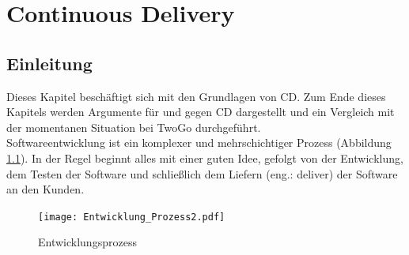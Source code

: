 
\chapter{Continuous Delivery}

\section{Einleitung}
Dieses Kapitel beschäftigt sich mit den Grundlagen von \acl{CD}. Zum Ende dieses Kapitels werden Argumente für und gegen \acs{CD} dargestellt und ein Vergleich mit der momentanen Situation bei TwoGo durchgeführt.\\
Softwareentwicklung ist ein komplexer und mehrschichtiger Prozess (Abbildung \ref{img:Entwicklungsprozess}). In der Regel beginnt alles mit einer guten Idee, gefolgt von der Entwicklung, dem Testen der Software und schließlich dem Liefern (eng.: deliver) der Software an den Kunden.
\begin{figure}[H]
    \centering
    \texttt{[image: Entwicklung\_Prozess2.pdf]}
    \caption{Entwicklungsprozess} \cite[Seite 9 (angelehnt)]{swartout_continuous_2012}
  \label{img:Entwicklungsprozess}
\end{figure}

